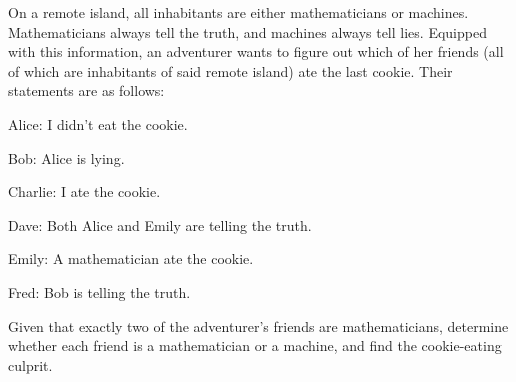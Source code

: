 On a remote island, all inhabitants are either mathematicians or machines. Mathematicians always tell the truth, and machines always tell lies. Equipped with this information, an adventurer wants to figure out which of her friends (all of which are inhabitants of said remote island) ate the last cookie. Their statements are as follows:



Alice: I didn't eat the cookie.

Bob: Alice is lying.

Charlie: I ate the cookie.

Dave: Both Alice and Emily are telling the truth.

Emily: A mathematician ate the cookie.

Fred: Bob is telling the truth.



Given that exactly two of the adventurer's friends are mathematicians, determine whether each friend is a mathematician or a machine, and find the cookie-eating culprit.
